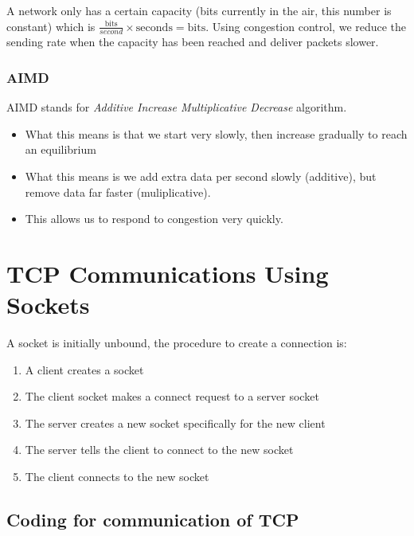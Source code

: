 A network only has a certain capacity (bits currently in the air, this number is constant) which is \(\frac{\mathrm{bits}}{second} \times \mathrm{seconds} = \mathrm{bits}\).
Using congestion control, we reduce the sending rate when the capacity has been reached and deliver packets slower.

\subsubsection{AIMD}\label{ssub:aimd}

AIMD stands for \emph{Additive Increase Multiplicative Decrease} algorithm.
\begin{itemize}
    \item What this means is that we start very slowly, then increase gradually to reach an equilibrium
    \item What this means is we add extra data per second slowly (additive), but remove data far faster (muliplicative).
    \item This allows us to respond to congestion very quickly.
\end{itemize}

\section{TCP Communications Using Sockets}\label{sec:tcp_communications_using_sockets}

A socket is initially unbound, the procedure to create a connection is:
\begin{enumerate}
    \item A client creates a socket
    \item The client socket makes a connect request to a server socket
    \item The server creates a new socket specifically for the new client
    \item The server tells the client to connect to the new socket
    \item The client connects to the new socket
\end{enumerate}

\subsection{Coding for communication of TCP}\label{sub:coding_for_communication_of_tcp}

